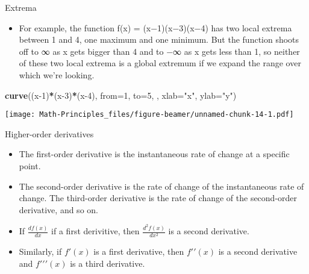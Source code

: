 \documentclass[
  ignorenonframetext,
]{beamer}
\newenvironment{Shaded}{\begin{snugshade}}{\end{snugshade}}
\newcommand{\DataTypeTok}[1]{\textcolor[rgb]{0.13,0.29,0.53}{#1}}
\newcommand{\DecValTok}[1]{\textcolor[rgb]{0.00,0.00,0.81}{#1}}
\newcommand{\KeywordTok}[1]{\textcolor[rgb]{0.13,0.29,0.53}{\textbf{#1}}}
\newcommand{\NormalTok}[1]{#1}
\newcommand{\OperatorTok}[1]{\textcolor[rgb]{0.81,0.36,0.00}{\textbf{#1}}}
\newcommand{\StringTok}[1]{\textcolor[rgb]{0.31,0.60,0.02}{#1}}
\providecommand{\tightlist}{%
  \setlength{\itemsep}{0pt}\setlength{\parskip}{0pt}}
\begin{document}
\begin{frame}[fragile]{Extrema}
\protect\hypertarget{extrema-2}{}

\begin{itemize}
\tightlist
\item
  For example, the function f(x) = (x−1)(x−3)(x−4) has two local extrema
  between 1 and 4, one maximum and one minimum. But the function shoots
  off to ∞ as x gets bigger than 4 and to −∞ as x gets less than 1, so
  neither of these two local extrema is a global extremum if we expand
  the range over which we're looking.
\end{itemize}

\begin{Shaded}
\begin{Highlighting}[]
\KeywordTok{curve}\NormalTok{((x}\DecValTok{-1}\NormalTok{)}\OperatorTok{*}\NormalTok{(x}\DecValTok{-3}\NormalTok{)}\OperatorTok{*}\NormalTok{(x}\DecValTok{-4}\NormalTok{), }\DataTypeTok{from=}\DecValTok{1}\NormalTok{, }\DataTypeTok{to=}\DecValTok{5}\NormalTok{, , }\DataTypeTok{xlab=}\StringTok{"x"}\NormalTok{, }\DataTypeTok{ylab=}\StringTok{"y"}\NormalTok{)}
\end{Highlighting}
\end{Shaded}

\texttt{[image: Math-Principles\_files/figure-beamer/unnamed-chunk-14-1.pdf]}

\end{frame}

\begin{frame}{Higher-order derivatives}
\protect\hypertarget{higher-order-derivatives}{}

\begin{itemize}
\item
  The first-order derivative is the instantaneous rate of change at a
  specific point.
\item
  The second-order derivative is the rate of change of the instantaneous
  rate of change. The third-order derivative is the rate of change of
  the second-order derivative, and so on.
\item
  If \(\frac{df(x)}{dx}\) if a first derivitive, then
  \(\frac{d^{2}f(x)}{dx^{2}}\) is a second derivative.
\item
  Similarly, if \(f′(x)\) is a first derivative, then \(f′′(x)\) is a
  second derivative and \(f′′′(x)\) is a third derivative.
\end{itemize}

\end{frame}
\end{document}
